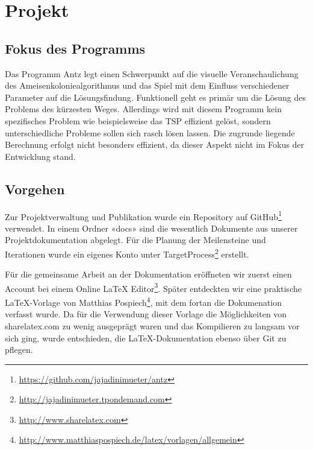 

\chapter{Projekt}



\section{Fokus des Programms}

Das Programm Antz legt einen Schwerpunkt auf die visuelle Veranschaulichung des
Ameisenkoloniealgorithmus und das Spiel mit dem Einfluss verschiedener Parameter
auf die Lösungsfindung. Funktionell geht es primär um die Lösung des Problems
des kürzesten Weges. Allerdings wird mit diesem Programm kein spezifisches
Problem wie beispielsweise das TSP effizient gelöst, sondern unterschiedliche
Probleme sollen sich rasch lösen lassen. Die zugrunde liegende Berechnung
erfolgt nicht besonders effizient, da dieser Aspekt nicht im Fokus der
Entwicklung stand.





\section{Vorgehen}

Zur Projektverwaltung und Publikation wurde ein Repository auf
GitHub\footnote{\url{https://github.com/jajadinimueter/antz}} verwendet. In
einem Ordner «docs» sind die wesentlich Dokumente aus unserer
Projektdokumentation abgelegt. Für die Planung der Meilensteine und Iterationen
wurde ein eigenes Konto unter
TargetProcess\footnote{\url{http://jajadinimueter.tpondemand.com}} erstellt.

Für die gemeinsame Arbeit an der Dokumentation eröffneten wir zuerst einen
Account bei einem Online LaTeX Editor\footnote{\url{http://www.sharelatex.com}}.
Später entdeckten wir eine praktische LaTeX-Vorlage von Matthias
Pospiech\footnote{\url{http://www.matthiaspospiech.de/latex/vorlagen/allgemein}},
mit dem fortan die Dokumenation verfasst wurde. Da für die Verwendung dieser
Vorlage die Möglichkeiten von sharelatex.com zu wenig ausgeprägt waren und das
Kompilieren zu langsam vor sich ging, wurde entschieden, die LaTeX-Dokumentation
ebenso über Git zu pflegen.

